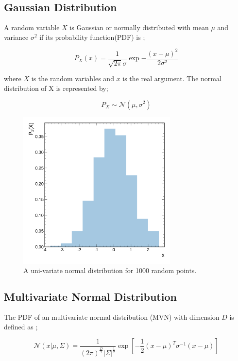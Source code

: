 \documentclass{article}
\begin{document}
\subsection{Gaussian Distribution}

A random variable $X$ is Gaussian or normally distributed with mean $\mu$ and variance $\sigma^{2}$ if its probability function(PDF) is \cite{murphy2012machine};

\begin{equation}
P_{X}(x) = \frac{1}{\sqrt{2\pi}\sigma}\exp{-\frac{(x-\mu)^{2}}{2\sigma^{2}}}
\end{equation}

where $X$ is the random variables and $x$ is the real argument. The normal distribution of X is represented by;

\begin{equation}
P_{X} \sim \mathcal{N}(\mu, \sigma^{2})
\end{equation}

\begin{figure}
\centering
\includegraphics[width=8.0cm]{imgs/norm.png}
\caption{A uni-variate normal distribution for 1000 random points.}
\end{figure}

\subsection{Multivariate Normal Distribution}

The PDF of an multivariate normal distribution (MVN) with dimension $D$ is defined as \cite{murphy2012machine};

\begin{equation}
\mathcal{N}(x|\mu, \Sigma) = \frac{1}{(2\pi)^{\frac{D}{2}} |\Sigma|^{\frac{1}{2}}} \exp[{-\frac{1}{2}(x-\mu)^{T} \sigma^{-1}(x - \mu)}]
\end{equation}
\end{document}
